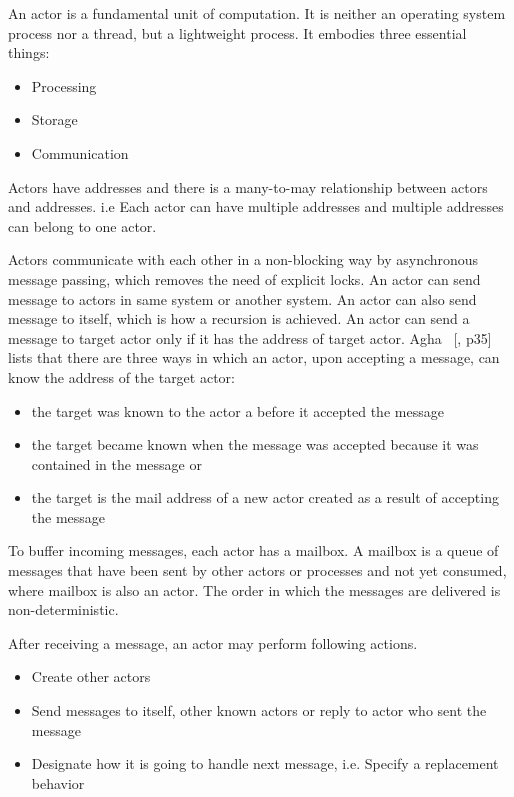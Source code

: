   An actor is a fundamental unit of computation. It is neither an operating system process nor a thread, but a lightweight process. It embodies three essential things:
\begin{itemize}
  \item Processing
  \item Storage
  \item Communication
\end{itemize}
  Actors have addresses and there is a many-to-may relationship between actors and addresses. i.e Each actor can have multiple addresses and multiple addresses can belong to one actor.

  Actors communicate with each other in a non-blocking way by asynchronous message passing, which removes the need of explicit locks. An actor can send message to actors in same system or another system. An actor can also send message to itself, which is how a recursion is achieved. An actor can send a message to target actor only if it has the address of target actor. Agha ~[\parencite{agha}, p35] lists that there are three ways in which an actor, upon accepting a message, can know the address of the target actor:
  \begin{itemize}
    \item the target was known to the actor a before it accepted the  message
    \item the target became known when the message was accepted because it was contained in the message or
    \item the target is the mail address of a new actor created as a result of accepting the message
  \end{itemize}

  To buffer incoming messages, each actor has a mailbox. A mailbox is a queue of messages that have been sent by other actors or processes and not yet consumed, where mailbox is also an actor. The order in which the messages are delivered is non-deterministic.~\cite{hewittVideo}

After receiving a message, an actor may perform following actions.~\parencite{hewitt}
\begin{itemize}
  \item Create other actors
  \item Send messages to itself, other known actors or reply to actor who sent the message
  \item Designate how it is going to handle next message, i.e. Specify a replacement behavior
\end{itemize}

